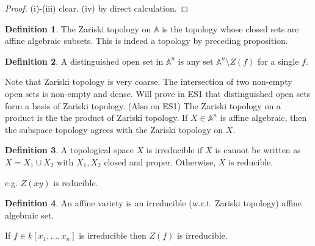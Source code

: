 \documentclass{article}
\theoremstyle{definition}
\newtheorem{defn}{Definition}[section]
\theoremstyle{remark}
\theoremstyle{plain}
\newcommand{\bA}{\mathbb{A}}
\begin{document}
\begin{proof}
    (i)-(iii) clear. (iv) by direct calculation.
\end{proof}
\begin{defn}
    The Zariski topology on $\bA$ is the topology whose closed sets are affine algebraic subsets. This is indeed a topology by preceding proposition.
\end{defn}
\begin{defn}
    A distinguished open set in $\bA^n$ is any set $\bA^n\setminus Z(f)$ for a single $f$.
\end{defn}
Note that Zariski topology is very coarse. The intersection of two non-empty open sets is non-empty and dense. Will prove in ES1 that distinguished open sets form a basis of Zariski topology. (Also on ES1) The Zariski topology on a product is the the product of Zariski topology. If $X\in \bA^n$ is affine algebraic, then the subspace topology agrees with the Zariski topology on $X$.

\begin{defn}
    A topological space $X$ is irreducible if $X$ is cannot be written as $X=X_1\cup X_2$ with $X_1, X_2$ closed and proper. Otherwise, $X$ is reducible.
\end{defn}
e.g. $Z(xy)$ is reducible.
\begin{defn}
    An affine variety is an irreducible (w.r.t. Zariski topology) affine algebraic set.
\end{defn}
If $f\in k[x_1,...,x_n]$ is irreducible then $Z(f)$ is irreducible.
\end{document}
